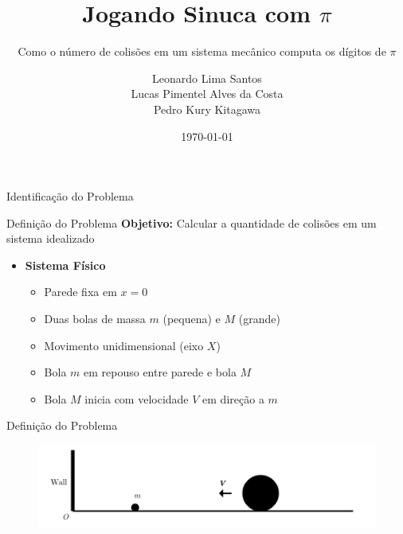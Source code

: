 \documentclass{beamer}
\title{Jogando Sinuca com $\pi$}
\subtitle{Como o número de colisões em um sistema mecânico computa os dígitos de $\pi$}
\author{Leonardo Lima Santos \\ Lucas Pimentel Alves da Costa \\ Pedro Kury Kitagawa}
\date{\today}
\begin{document}
\maketitle

\begin{frame}[plain]
    \centering
    \vfill
    {\Huge {}Identificação do Problema}
    \vfill
\end{frame}


\begin{frame}{Definição do Problema}
  \textbf{Objetivo:} Calcular a quantidade de colisões em um sistema idealizado
  \begin{itemize}
    \item \textbf{Sistema Físico}
      \begin{itemize}
        \item Parede fixa em $x = 0$
        \item Duas bolas de massa $m$ (pequena) e $M$ (grande)
        \item Movimento unidimensional (eixo $X$)
        \item Bola $m$ em repouso entre parede e bola $M$
        \item Bola $M$ inicia com velocidade $V$ em direção a $m$
      \end{itemize}
  \end{itemize}
\end{frame}


\begin{frame}{Definição do Problema}
  \begin{figure}
    \centering
    \includegraphics[width=1\textwidth]{images/image.png}
  \end{figure}
\end{frame}
\end{document}
